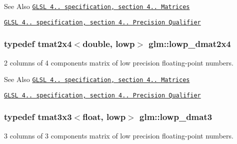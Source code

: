 \begin{DoxySeeAlso}{See Also}
\href{http://www.opengl.org/registry/doc/GLSLangSpec.4.20.8.pdf}{\tt G\-L\-S\-L 4.. specification, section 4.. Matrices} 

\href{http://www.opengl.org/registry/doc/GLSLangSpec.4.20.8.pdf}{\tt G\-L\-S\-L 4.. specification, section 4.. Precision Qualifier} 
\end{DoxySeeAlso}
\hypertarget{group__core__precision_ga2aee5f52e32f0adcfdeb3142b50cb660}{
\subsubsection[{lowp\-\_\-dmat2x4}]{\setlength{\rightskip}{0pt plus 5cm}typedef tmat2x4$<$double, lowp$>$ {\bf glm\-::lowp\-\_\-dmat2x4}}}\label{group__core__precision_ga2aee5f52e32f0adcfdeb3142b50cb660}
2 columns of 4 components matrix of low precision floating-\/point numbers.

\begin{DoxySeeAlso}{See Also}
\href{http://www.opengl.org/registry/doc/GLSLangSpec.4.20.8.pdf}{\tt G\-L\-S\-L 4.. specification, section 4.. Matrices} 

\href{http://www.opengl.org/registry/doc/GLSLangSpec.4.20.8.pdf}{\tt G\-L\-S\-L 4.. specification, section 4.. Precision Qualifier} 
\end{DoxySeeAlso}
\hypertarget{group__core__precision_ga2a63ac35bb66e49374db9f699bef9597}{
\subsubsection[{lowp\-\_\-dmat3}]{\setlength{\rightskip}{0pt plus 5cm}typedef tmat3x3$<$float, lowp$>$ {\bf glm\-::lowp\-\_\-dmat3}}}\label{group__core__precision_ga2a63ac35bb66e49374db9f699bef9597}
3 columns of 3 components matrix of low precision floating-\/point numbers.

